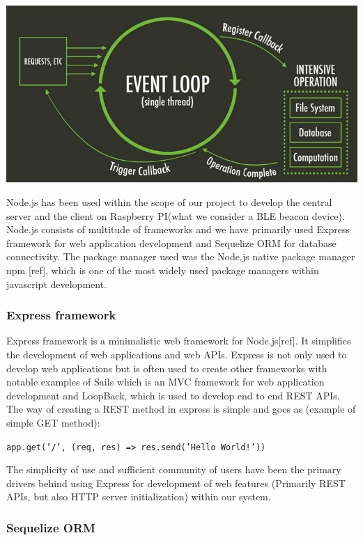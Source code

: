 \bigskip
\includegraphics[scale=0.3]{gfx/node} 
\bigskip

Node.js has been used within the scope of our project to develop the central server and the client on Raspberry PI(what we consider a BLE beacon device). Node.js consists of multitude of frameworks and we have primarily used Express framework for web application development and Sequelize ORM for database connectivity. The package manager used was the Node.js native package manager npm [ref], which is one of the most widely used package managers within javascript development.

\subsubsection{Express framework}
\label{subsubsec:express}

Express framework is a minimalistic web framework for Node.js[ref]. It simplifies the development of web applications and web APIs. Express is not only used to develop web applications but is often used to create other frameworks with notable examples of Sails which is an MVC framework for web application development and LoopBack, which is used to develop end to end REST APIs. The way of creating a REST method in express is simple and goes as (example of simple GET method):\newline 

\smallskip
{\tt app.get('/', (req, res) => res.send('Hello World!'))}
\newline
\smallskip

The simplicity of use and sufficient community of users have been the primary drivers behind using Express for development of web features (Primarily REST APIs, but also HTTP server initialization) within our system.

\subsubsection{Sequelize ORM}
\label{subsubsec:sequelize}

